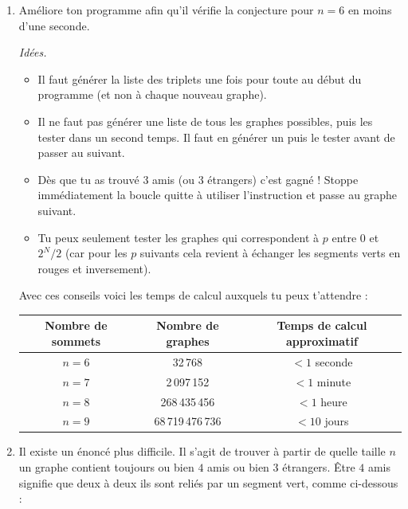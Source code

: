 \documentclass[11pt,class=report,crop=false]{standalone}
\begin{document}
\begin{activite}


\begin{enumerate}
  \item Améliore ton programme afin qu'il vérifie la conjecture pour $n=6$ en moins d'une seconde.
  
  
\emph{Idées.}
  \begin{itemize}
    \item Il faut générer la liste des triplets une fois pour toute au début du programme (et non à chaque nouveau graphe).
    \item Il ne faut pas générer une liste de tous les graphes possibles, puis les tester dans un second temps. Il faut en générer un puis le tester avant de passer au suivant.
    \item Dès que tu as trouvé $3$ amis (ou $3$ étrangers) c'est gagné ! Stoppe immédiatement la boucle quitte à utiliser l'instruction  et passe au graphe suivant.
    \item Tu peux seulement tester les graphes qui correspondent à $p$ entre $0$ et $2^{N}/2$ (car pour les $p$ suivants cela revient à échanger les segments verts en rouges et inversement).
  \end{itemize}
  
  
  Avec ces conseils voici les temps de calcul auxquels tu peux t'attendre :
  \begin{center}
  \begin{tabular}{|c|c|c|}
  \hline
  Nombre de sommets & Nombre de graphes & Temps de calcul approximatif \\
  \hline\hline
  $n=6$ & 32\,768 & $< 1$ seconde \\
  $n=7$ & 2\,097\,152 & $< 1$ minute \\  
  $n=8$ & 268\,435\,456 & $< 1$ heure \\
  $n=9$ & 68\,719\,476\,736 & $< 10$ jours \\ 
  \hline
  \end{tabular} 
  \end{center}




 
  \item Il existe un énoncé plus difficile. Il s'agit de trouver à partir de quelle taille $n$ un graphe contient toujours ou bien $4$ amis ou bien $3$ étrangers. 
  \^Etre $4$ amis signifie que deux à deux ils sont reliés par un segment vert, comme ci-dessous :


\end{enumerate}
\end{activite}
\end{document}
